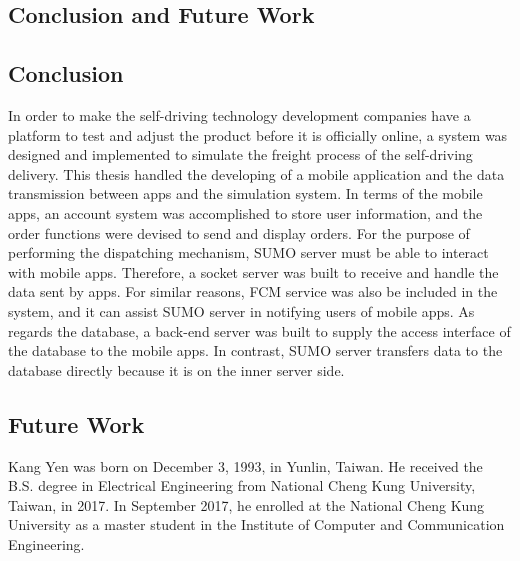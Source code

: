 \documentclass[12pt]{ksthesis}
\begin{document}
\begin{thesis}
{%




\chapter{Conclusion and Future Work} \label{Chap:Conclusion}

\section{Conclusion}
In order to make the self-driving technology development companies have a platform to test and adjust the product before it is officially online, a system was designed and implemented to simulate the freight process of the self-driving delivery. This thesis handled the developing of a mobile application and the data transmission between apps and the simulation system. In terms of the mobile apps, an account system was accomplished to store user information, and the order functions were devised to send and display orders. For the purpose of performing the dispatching mechanism, SUMO server must be able to interact with mobile apps. Therefore, a socket server was built to receive and handle the data sent by apps. For similar reasons, FCM service was also be included in the system, and it can assist SUMO server in notifying users of mobile apps. As regards the database, a back-end server was built to supply the access interface of the database to the mobile apps. In contrast, SUMO server transfers data to the database directly because it is on the inner server side.


\section{Future Work}


} \end{thesis}

\singlespace {\large



}



\doublespace

\begin{vita}
\Thesisspace \large{

Kang Yen was born on December 3, 1993, in Yunlin, Taiwan.  He received the B.S. degree in Electrical Engineering from National Cheng Kung University, Taiwan, in 2017. In September 2017, he enrolled at the National Cheng Kung University as a master student in the Institute of Computer and Communication Engineering.

}\end{vita}
\end{document}

